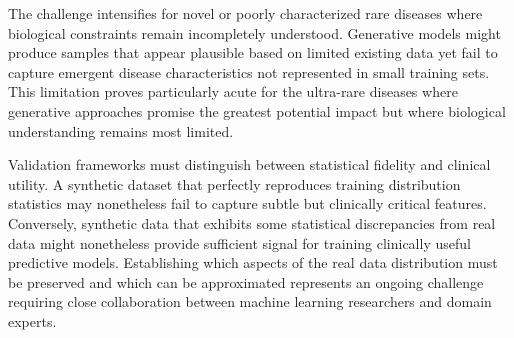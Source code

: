 The challenge intensifies for novel or poorly characterized rare diseases where biological constraints remain incompletely understood. Generative models might produce samples that appear plausible based on limited existing data yet fail to capture emergent disease characteristics not represented in small training sets. This limitation proves particularly acute for the ultra-rare diseases where generative approaches promise the greatest potential impact but where biological understanding remains most limited.

Validation frameworks must distinguish between statistical fidelity and clinical utility. A synthetic dataset that perfectly reproduces training distribution statistics may nonetheless fail to capture subtle but clinically critical features. Conversely, synthetic data that exhibits some statistical discrepancies from real data might nonetheless provide sufficient signal for training clinically useful predictive models. Establishing which aspects of the real data distribution must be preserved and which can be approximated represents an ongoing challenge requiring close collaboration between machine learning researchers and domain experts.
